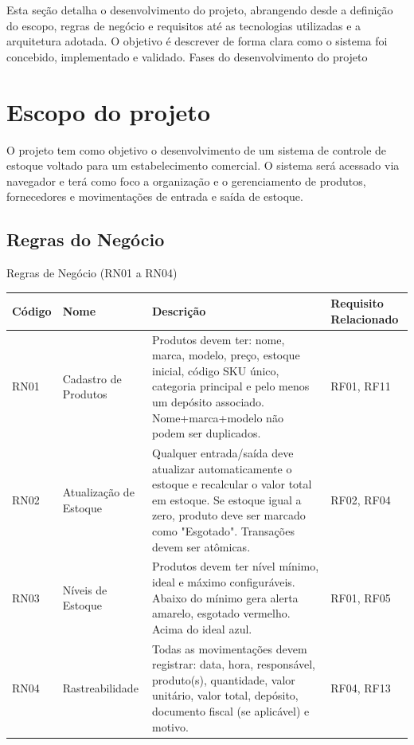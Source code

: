 \documentclass[
	12pt,				%
	openany,			%
	twoside,			%
	a4paper,			%
	english,			%
	brazil				%
	]{abntex2}
\begin{document}
Esta seção detalha o desenvolvimento do projeto, abrangendo desde a definição do escopo, regras de negócio e requisitos até as tecnologias utilizadas e a arquitetura adotada. O objetivo é descrever de forma clara como o sistema foi concebido, implementado e validado.
Fases do desenvolvimento do projeto
\section{Escopo do projeto}

O projeto tem como objetivo o desenvolvimento de um sistema de controle de estoque voltado para um estabelecimento comercial. O sistema será acessado via navegador e terá como foco a organização e o gerenciamento de produtos, fornecedores e movimentações de entrada e saída de estoque.




\subsection{Regras do Negócio}



\begin{quadro}[htb]
\caption{\label{quadro_rn1}Regras de Negócio (RN01 a RN04)}
\centering
\begin{tabular}{|p{1.6cm}|p{4.0cm}|p{7.5cm}|p{2.0cm}|}
    \hline
    \textbf{Código} & \textbf{Nome} & \textbf{Descrição} & \textbf{Requisito Relacionado} \\ \hline

    RN01 & Cadastro de Produtos & Produtos devem ter: nome, marca, modelo, preço, estoque inicial, código SKU único, categoria principal e pelo menos um depósito associado. Nome+marca+modelo não podem ser duplicados. & RF01, RF11 \\ \hline

RN02 & Atualização de Estoque & Qualquer entrada/saída deve atualizar automaticamente o estoque e recalcular o valor total em estoque. Se estoque igual a zero, produto deve ser marcado como "Esgotado". Transações devem ser atômicas. & RF02, RF04 \\ \hline

RN03 & Níveis de Estoque & Produtos devem ter nível mínimo, ideal e máximo configuráveis. Abaixo do mínimo gera alerta amarelo, esgotado vermelho. Acima do ideal azul. & RF01, RF05 \\ \hline

RN04 & Rastreabilidade & Todas as movimentações devem registrar: data, hora, responsável, produto(s), quantidade, valor unitário, valor total, depósito, documento fiscal (se aplicável) e motivo. & RF04, RF13 \\ \hline

    

\end{tabular}
\end{quadro}
\end{document}
